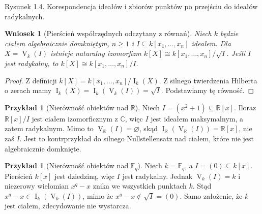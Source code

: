 \documentclass[11pt,a4paper,openany]{report}
\numberwithin{equation}{section}
\theoremstyle{plain}
\newtheorem{wniosek}[twierdzenie]{Wniosek}
\theoremstyle{definition}
\newtheorem{przyklad}[twierdzenie]{Przykład}
\theoremstyle{remark}
\newcommand{\R}{\mathbb R}
\newcommand{\C}{\mathbb C}
\newcommand{\F}{\mathbb F}
\newcommand{\V}{\operatorname V}
\newcommand{\I}{\operatorname I}
\begin{document}
\begin{center}
\end{center}
\begin{center}\small Rysunek 1.4. Korespondencja ideałów i zbiorów punktów po przejściu do ideałów radykalnych.\end{center}

\begin{wniosek}[Pierścień współrzędnych odczytany z równań]
\label{wn:coordinate-ring}
Niech $k$ będzie ciałem algebraicznie domkniętym,
$n\ge1$ i $I\subseteq k[x_1,\dots,x_n]$ ideałem.
Dla $X=\V_k(I)$ istnieje naturalny izomorfizm
$k[X]\cong k[x_1,\dots,x_n]/\sqrt I$.
Jeśli $I$ jest radykalny, to $k[X]\cong k[x_1,\dots,x_n]/I$.
\end{wniosek}
\begin{proof}
Z definicji $k[X]=k[x_1,\dots,x_n]/\I_k(X)$.
Z silnego twierdzenia Hilberta o zerach mamy
$\I_k(X)=\I_k(\V_k(I))=\sqrt I$. Podstawiamy tę równość.
\end{proof}

\begin{przyklad}[Nierówność obiektów nad $\R$]
Niech $I=(x^2+1)\subseteq\R[x]$.
Iloraz $\R[x]/I$ jest ciałem izomorficznym z $\C$, więc
$I$ jest ideałem maksymalnym, a zatem radykalnym.
Mimo to $\V_{\R}(I)=\varnothing$, skąd
$\I_{\R}(\V_{\R}(I))=\R[x]$, nie zaś $I$.
Jest to kontrprzykład do silnego Nullstellensatz nad
ciałem, które nie jest algebraicznie domknięte.
\end{przyklad}

\begin{przyklad}[Nierówność obiektów nad $\F_q$]
Niech $k=\F_q$, a $I=(0)\subseteq k[x]$.
Pierścień $k[x]$ jest dziedziną, więc $I$ jest radykalny.
Jednak $\V_k(I)=k$ i niezerowy wielomian $x^q-x$
znika we wszystkich punktach $k$. Stąd
$x^q-x\in\I_k(\V_k(I))$, mimo że $x^q-x\notin\sqrt I=(0)$.
Samo założenie, że $k$ jest ciałem, zdecydowanie nie wystarcza.
\end{przyklad}
\end{document}
